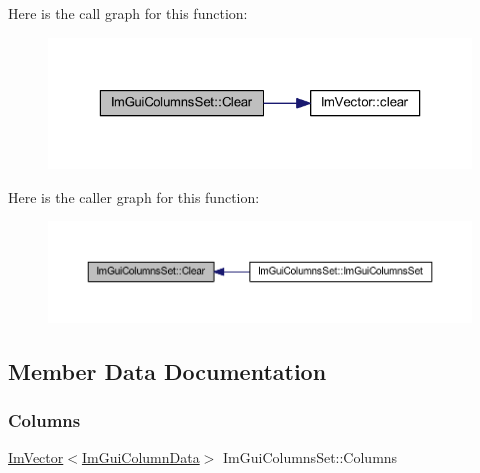 Here is the call graph for this function\+:
\nopagebreak
\begin{figure}[H]
\begin{center}
\leavevmode
\includegraphics[width=323pt]{struct_im_gui_columns_set_acbaeb17ee3c2026ff36ecba69906eb6c_cgraph}
\end{center}
\end{figure}
Here is the caller graph for this function\+:
\nopagebreak
\begin{figure}[H]
\begin{center}
\leavevmode
\includegraphics[width=350pt]{struct_im_gui_columns_set_acbaeb17ee3c2026ff36ecba69906eb6c_icgraph}
\end{center}
\end{figure}


\subsection{Member Data Documentation}
\mbox{\label{struct_im_gui_columns_set_a7922acd94294791c3babf3ee92896d08}} 
\subsubsection{\texorpdfstring{Columns}{Columns}}
{\footnotesize\ttfamily \mbox{\hyperlink{class_im_vector}{Im\+Vector}}$<$\mbox{\hyperlink{struct_im_gui_column_data}{Im\+Gui\+Column\+Data}}$>$ Im\+Gui\+Columns\+Set\+::\+Columns}

\mbox{\label{struct_im_gui_columns_set_aaa3e86fc2582a6bb749172a04b9d934c}} 
